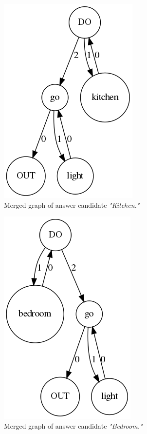 \begin{figure}
	\centering
	\includegraphics[scale=0.3]{figures/comp}
	\caption{Merged graph of answer candidate \textit{"Kitchen."}}
	\label{fig:merge1}
\end{figure}

\begin{figure}
	\centering
	\includegraphics[scale=0.3]{figures/comp2}
	\caption{Merged graph of answer candidate \textit{"Bedroom."}}
	\label{fig:merge2}
\end{figure}


